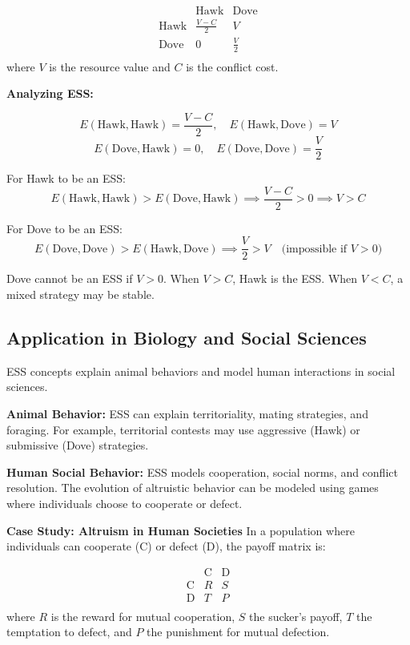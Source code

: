 \documentclass[12pt]{book} %
\begin{document}
\[
\begin{array}{c|cc}
 & \text{Hawk} & \text{Dove} \\
\hline
\text{Hawk} & \frac{V - C}{2} & V \\
\text{Dove} & 0 & \frac{V}{2} \\
\end{array}
\]
where \( V \) is the resource value and \( C \) is the conflict cost.

\textbf{Analyzing ESS:}

\[
E(\text{Hawk}, \text{Hawk}) = \frac{V - C}{2}, \quad E(\text{Hawk}, \text{Dove}) = V
\]
\[
E(\text{Dove}, \text{Hawk}) = 0, \quad E(\text{Dove}, \text{Dove}) = \frac{V}{2}
\]

For Hawk to be an ESS:
\[
E(\text{Hawk}, \text{Hawk}) > E(\text{Dove}, \text{Hawk}) \implies \frac{V - C}{2} > 0 \implies V > C
\]

For Dove to be an ESS:
\[
E(\text{Dove}, \text{Dove}) > E(\text{Hawk}, \text{Dove}) \implies \frac{V}{2} > V \quad \text{(impossible if } V > 0\text{)}
\]

Dove cannot be an ESS if \( V > 0 \). When \( V > C \), Hawk is the ESS. When \( V < C \), a mixed strategy may be stable.

\subsection{Application in Biology and Social Sciences}

ESS concepts explain animal behaviors and model human interactions in social sciences.

\textbf{Animal Behavior:}
ESS can explain territoriality, mating strategies, and foraging. For example, territorial contests may use aggressive (Hawk) or submissive (Dove) strategies.

\textbf{Human Social Behavior:}
ESS models cooperation, social norms, and conflict resolution. The evolution of altruistic behavior can be modeled using games where individuals choose to cooperate or defect.

\textbf{Case Study: Altruism in Human Societies}
In a population where individuals can cooperate (C) or defect (D), the payoff matrix is:

\[
\begin{array}{c|cc}
 & \text{C} & \text{D} \\
\hline
\text{C} & R & S \\
\text{D} & T & P \\
\end{array}
\]
where \( R \) is the reward for mutual cooperation, \( S \) the sucker's payoff, \( T \) the temptation to defect, and \( P \) the punishment for mutual defection.
\end{document}

